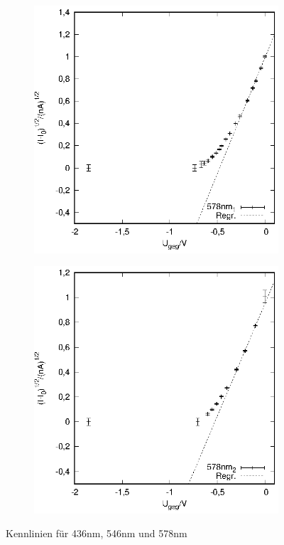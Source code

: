 \begin{figure}[hbt]
\begin{subfigure}[h]{0.5\textwidth}
  \end{subfigure}
  \begin{subfigure}[h]{0.5\textwidth}
    \centering
    \includegraphics{data/Messung_photoeffekt/578nm_1.eps}
  \end{subfigure}%
  \begin{subfigure}[h]{0.5\textwidth}
    \centering
    \includegraphics{data/Messung_photoeffekt/578nm_2.eps}
  \end{subfigure}%
  \caption{Kennlinien für 436nm, 546nm und 578nm}
  \label{kennlinien2}
\end{figure}

